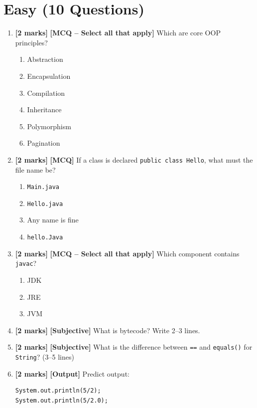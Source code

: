 \documentclass[11pt,a4paper]{article}
\newcommand{\EMarks}{\textbf{[2 marks]} }
\begin{document}
\section*{Easy (10 Questions)}
\begin{enumerate}[label=\textbf{E\arabic*.}, leftmargin=*]
  \item \EMarks \textbf{[MCQ -- Select all that apply]} Which are core OOP principles?
    \begin{enumerate}[label=(\Alph*), leftmargin=*]
      \item Abstraction
      \item Encapsulation
      \item Compilation
      \item Inheritance
      \item Polymorphism
      \item Pagination
    \end{enumerate}

  \item \EMarks \textbf{[MCQ]} If a class is declared \texttt{public class Hello}, what must the file name be?
    \begin{enumerate}[label=(\Alph*), leftmargin=*]
      \item \texttt{Main.java}
      \item \texttt{Hello.java}
      \item Any name is fine
      \item \texttt{hello.Java}
    \end{enumerate}

  \item \EMarks \textbf{[MCQ -- Select all that apply]} Which component contains \texttt{javac}?
    \begin{enumerate}[label=(\Alph*), leftmargin=*]
      \item JDK
      \item JRE
      \item JVM
    \end{enumerate}

  \item \EMarks \textbf{[Subjective]} What is bytecode? Write 2--3 lines.

  \item \EMarks \textbf{[Subjective]} What is the difference between \texttt{==} and \texttt{equals()} for \texttt{String}?
    (3--5 lines)

  \item \EMarks \textbf{[Output]} Predict output:
    \begin{lstlisting}
System.out.println(5/2);
System.out.println(5/2.0);
    \end{lstlisting}


\end{enumerate}
\end{document}
